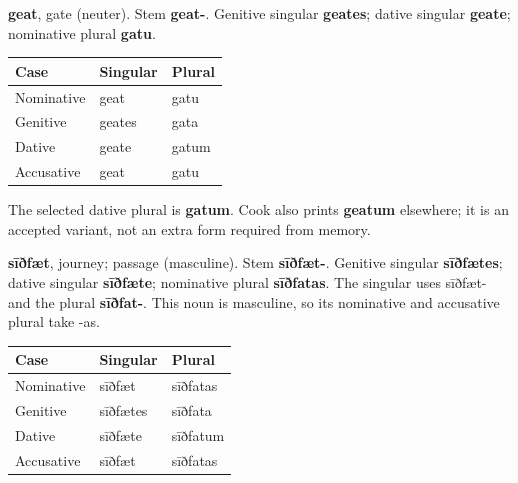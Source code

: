 \textbf{geat}, gate (neuter). Stem \textbf{geat-}. Genitive singular \textbf{geates}; dative singular \textbf{geate}; nominative plural \textbf{gatu}.

\par\begingroup
\fontsize{10.5}{13.2}\selectfont
\setlength{\LTleft}{0pt}\setlength{\LTright}{\fill}
\noindent
\begin{tabular}{@{}>{\raggedright\arraybackslash}p{39.46mm}>{\raggedright\arraybackslash}p{39.46mm}>{\raggedright\arraybackslash}p{39.46mm}@{}}
\toprule
\textbf{Case} & \textbf{Singular} & \textbf{Plural} \\
\midrule
Nominative & geat & gatu \\
Genitive & geates & gata \\
Dative & geate & gatum \\
Accusative & geat & gatu \\
\bottomrule
\end{tabular}
\par\endgroup

The selected dative plural is \textbf{gatum}. Cook also prints \textbf{geatum} elsewhere; it is an accepted variant, not an extra form required from memory.

\textbf{sīðfæt}, journey; passage (masculine). Stem \textbf{sīðfæt-}. Genitive singular \textbf{sīðfætes}; dative singular \textbf{sīðfæte}; nominative plural \textbf{sīðfatas}. The singular uses sīðfæt- and the plural \textbf{sīðfat-}. This noun is masculine, so its nominative and accusative plural take -as.

\par\begingroup
\fontsize{10.5}{13.2}\selectfont
\setlength{\LTleft}{0pt}\setlength{\LTright}{\fill}
\noindent
\begin{tabular}{@{}>{\raggedright\arraybackslash}p{39.46mm}>{\raggedright\arraybackslash}p{39.46mm}>{\raggedright\arraybackslash}p{39.46mm}@{}}
\toprule
\textbf{Case} & \textbf{Singular} & \textbf{Plural} \\
\midrule
Nominative & sīðfæt & sīðfatas \\
Genitive & sīðfætes & sīðfata \\
Dative & sīðfæte & sīðfatum \\
Accusative & sīðfæt & sīðfatas \\
\bottomrule
\end{tabular}
\par\endgroup

